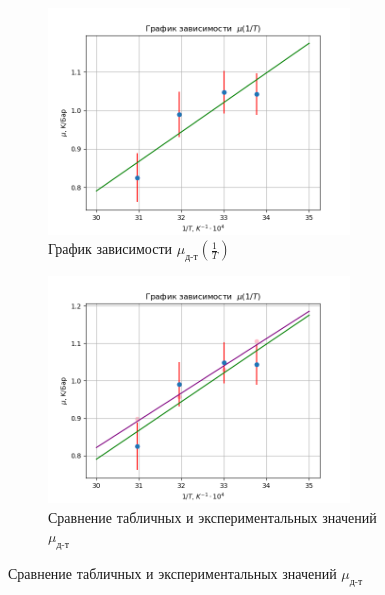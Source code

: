\begin{figure}
    \centering
    \begin{subfigure}{0.45\linewidth}
        \includegraphics[width=8cm]{muT.png}
        \caption{График зависимости $\mu_{\text{д-т}}(\frac{1}{T})$}
    \end{subfigure}
    \hfill
    \begin{subfigure}{0.45\linewidth}
        \includegraphics[width=8cm]{TableVal.png}
        \caption{Сравнение табличных и экспериментальных значений $\mu_{\text{д-т}}$}
    \end{subfigure}
\end{figure}

